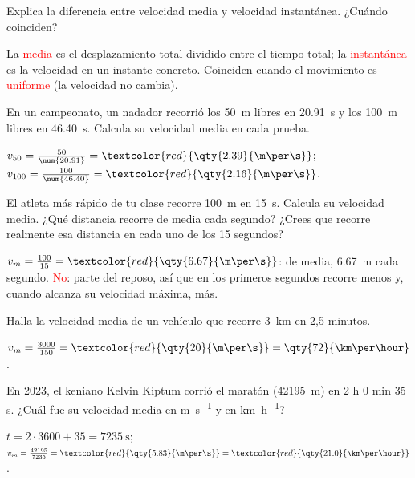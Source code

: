 \begin{exercise}
    Explica la diferencia entre velocidad media y velocidad instantánea. ¿Cuándo coinciden?
    \begin{solu}
        La \textcolor{red}{media} es el desplazamiento total dividido entre el tiempo total; la \textcolor{red}{instantánea} es la velocidad en un instante concreto. Coinciden cuando el movimiento es \textcolor{red}{uniforme} (la velocidad no cambia).
    \end{solu}
\end{exercise}

\begin{exercise}
    En un campeonato, un nadador recorrió los \qty{50}{\m} libres en \qty{20.91}{\s} y los \qty{100}{\m} libres en \qty{46.40}{\s}. Calcula su velocidad media en cada prueba.
    \begin{solu}
        \(v_{50} = \frac{50}{\num{20.91}} = \textcolor{red}{\qty{2.39}{\m\per\s}}\); \quad \(v_{100} = \frac{100}{\num{46.40}} = \textcolor{red}{\qty{2.16}{\m\per\s}}\).
    \end{solu}
\end{exercise}

\begin{exercise}
    El atleta más rápido de tu clase recorre \qty{100}{\m} en \qty{15}{\s}. Calcula su velocidad media. ¿Qué distancia recorre de media cada segundo? ¿Crees que recorre realmente esa distancia en cada uno de los 15 segundos?
    \begin{solu}
        \(v_m = \frac{100}{15} = \textcolor{red}{\qty{6.67}{\m\per\s}}\): de media, \qty{6.67}{\m} cada segundo. \textcolor{red}{No}: parte del reposo, así que en los primeros segundos recorre menos y, cuando alcanza su velocidad máxima, más.
    \end{solu}
\end{exercise}

\begin{exercise}
    Halla la velocidad media de un vehículo que recorre \qty{3}{\km} en 2,5 minutos.
    \begin{solu}
        \(v_m = \frac{3000}{150} = \textcolor{red}{\qty{20}{\m\per\s}} = \qty{72}{\km\per\hour}\).
    \end{solu}
\end{exercise}

\begin{exercise}
    En 2023, el keniano Kelvin Kiptum corrió el maratón (\qty{42195}{\m}) en 2 h 0 min 35 s. ¿Cuál fue su velocidad media en \unit{\m\per\s} y en \unit{\km\per\hour}?
    \begin{solu}
        \(t = 2 \cdot 3600 + 35 = \qty{7235}{\s}\); \(v_m = \frac{42195}{7235} = \textcolor{red}{\qty{5.83}{\m\per\s}} = \textcolor{red}{\qty{21.0}{\km\per\hour}}\).
    \end{solu}
\end{exercise}

